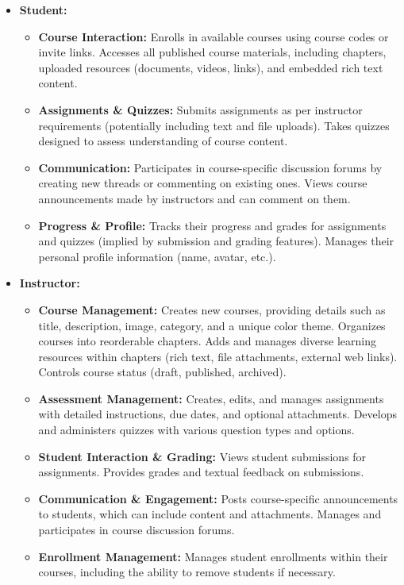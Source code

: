 \documentclass[12pt,a4paper]{article}
\begin{document}
\begin{itemize}
    \item \textbf{Student:}
    \begin{itemize}
        \item \textbf{Course Interaction:} Enrolls in available courses using course codes or invite links. Accesses all published course materials, including chapters, uploaded resources (documents, videos, links), and embedded rich text content.
        \item \textbf{Assignments \& Quizzes:} Submits assignments as per instructor requirements (potentially including text and file uploads). Takes quizzes designed to assess understanding of course content.
        \item \textbf{Communication:} Participates in course-specific discussion forums by creating new threads or commenting on existing ones. Views course announcements made by instructors and can comment on them.
        \item \textbf{Progress \& Profile:} Tracks their progress and grades for assignments and quizzes (implied by submission and grading features). Manages their personal profile information (name, avatar, etc.).
    \end{itemize}
    \item \textbf{Instructor:}
    \begin{itemize}
        \item \textbf{Course Management:} Creates new courses, providing details such as title, description, image, category, and a unique color theme. Organizes courses into reorderable chapters. Adds and manages diverse learning resources within chapters (rich text, file attachments, external web links). Controls course status (draft, published, archived).
        \item \textbf{Assessment Management:} Creates, edits, and manages assignments with detailed instructions, due dates, and optional attachments. Develops and administers quizzes with various question types and options.
        \item \textbf{Student Interaction \& Grading:} Views student submissions for assignments. Provides grades and textual feedback on submissions.
        \item \textbf{Communication \& Engagement:} Posts course-specific announcements to students, which can include content and attachments. Manages and participates in course discussion forums.
        \item \textbf{Enrollment Management:} Manages student enrollments within their courses, including the ability to remove students if necessary.

\end{itemize}
\end{itemize}
\end{document}
